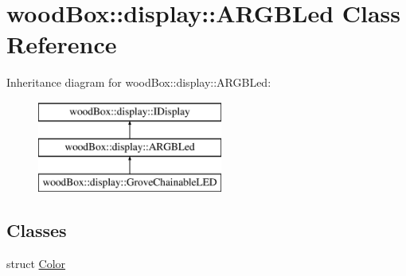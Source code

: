 \hypertarget{classwood_box_1_1display_1_1_a_r_g_b_led}{}\section{wood\+Box\+:\+:display\+:\+:A\+R\+G\+B\+Led Class Reference}
\label{classwood_box_1_1display_1_1_a_r_g_b_led}
Inheritance diagram for wood\+Box\+:\+:display\+:\+:A\+R\+G\+B\+Led\+:\begin{figure}[H]
\begin{center}
\leavevmode
\includegraphics[height=3.000000cm]{classwood_box_1_1display_1_1_a_r_g_b_led}
\end{center}
\end{figure}
\subsection*{Classes}
\begin{DoxyCompactItemize}
\item 
struct \mbox{\hyperlink{structwood_box_1_1display_1_1_a_r_g_b_led_1_1_color}{Color}}
\end{DoxyCompactItemize}
